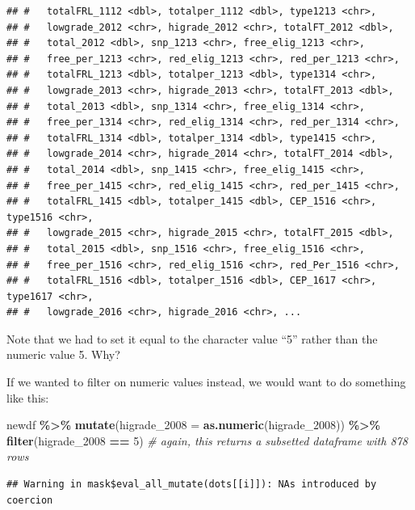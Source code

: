 \documentclass[
]{book}
\newenvironment{Shaded}{\begin{snugshade}}{\end{snugshade}}
\newcommand{\CommentTok}[1]{\textcolor[rgb]{0.56,0.35,0.01}{\textit{#1}}}
\newcommand{\DataTypeTok}[1]{\textcolor[rgb]{0.13,0.29,0.53}{#1}}
\newcommand{\DecValTok}[1]{\textcolor[rgb]{0.00,0.00,0.81}{#1}}
\newcommand{\KeywordTok}[1]{\textcolor[rgb]{0.13,0.29,0.53}{\textbf{#1}}}
\newcommand{\NormalTok}[1]{#1}
\newcommand{\OperatorTok}[1]{\textcolor[rgb]{0.81,0.36,0.00}{\textbf{#1}}}
\newcommand{\StringTok}[1]{\textcolor[rgb]{0.31,0.60,0.02}{#1}}
\begin{document}
\begin{verbatim}
## #   totalFRL_1112 <dbl>, totalper_1112 <dbl>, type1213 <chr>,
## #   lowgrade_2012 <chr>, higrade_2012 <chr>, totalFT_2012 <dbl>,
## #   total_2012 <dbl>, snp_1213 <chr>, free_elig_1213 <chr>,
## #   free_per_1213 <chr>, red_elig_1213 <chr>, red_per_1213 <chr>,
## #   totalFRL_1213 <dbl>, totalper_1213 <dbl>, type1314 <chr>,
## #   lowgrade_2013 <chr>, higrade_2013 <chr>, totalFT_2013 <dbl>,
## #   total_2013 <dbl>, snp_1314 <chr>, free_elig_1314 <chr>,
## #   free_per_1314 <chr>, red_elig_1314 <chr>, red_per_1314 <chr>,
## #   totalFRL_1314 <dbl>, totalper_1314 <dbl>, type1415 <chr>,
## #   lowgrade_2014 <chr>, higrade_2014 <chr>, totalFT_2014 <dbl>,
## #   total_2014 <dbl>, snp_1415 <chr>, free_elig_1415 <chr>,
## #   free_per_1415 <chr>, red_elig_1415 <chr>, red_per_1415 <chr>,
## #   totalFRL_1415 <dbl>, totalper_1415 <dbl>, CEP_1516 <chr>, type1516 <chr>,
## #   lowgrade_2015 <chr>, higrade_2015 <chr>, totalFT_2015 <dbl>,
## #   total_2015 <dbl>, snp_1516 <chr>, free_elig_1516 <chr>,
## #   free_per_1516 <chr>, red_elig_1516 <chr>, red_Per_1516 <chr>,
## #   totalFRL_1516 <dbl>, totalper_1516 <dbl>, CEP_1617 <chr>, type1617 <chr>,
## #   lowgrade_2016 <chr>, higrade_2016 <chr>, ...
\end{verbatim}

Note that we had to set it equal to the character value ``5'' rather than the numeric value 5. Why?

If we wanted to filter on numeric values instead, we would want to do something like this:

\begin{Shaded}
\begin{Highlighting}[]
\NormalTok{newdf }\OperatorTok{\%\textgreater{}\%}\StringTok{ }
\StringTok{  }\KeywordTok{mutate}\NormalTok{(}\DataTypeTok{higrade\_2008 =} \KeywordTok{as.numeric}\NormalTok{(higrade\_}\DecValTok{2008}\NormalTok{)) }\OperatorTok{\%\textgreater{}\%}\StringTok{ }
\StringTok{  }\KeywordTok{filter}\NormalTok{(higrade\_}\DecValTok{2008} \OperatorTok{==}\StringTok{ }\DecValTok{5}\NormalTok{) }\CommentTok{\# again, this returns a subsetted dataframe with 878 rows}
\end{Highlighting}
\end{Shaded}

\begin{verbatim}
## Warning in mask$eval_all_mutate(dots[[i]]): NAs introduced by coercion
\end{verbatim}
\end{document}
